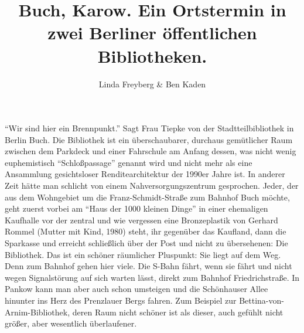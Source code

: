 \documentclass[a4paper,
fontsize=11pt,
oneside,
numbers=noperiodatend,
parskip=half-,
bibliography=totoc,
final
]{scrartcl}
\title{\LARGE{Buch, Karow. Ein Ortstermin in zwei Berliner öffentlichen Bibliotheken.}} %
\author{Linda Freyberg \& Ben Kaden} %
\date{}
\begin{document}
\maketitle
\thispagestyle{fancyplain} 


\enquote{Wir sind hier ein Brennpunkt.} Sagt Frau Tiepke von der
Stadtteilbibliothek in Berlin Buch. Die Bibliothek ist ein
überschaubarer, durchaus gemütlicher Raum zwischen dem Parkdeck und
einer Fahrschule am Anfang dessen, was nicht wenig euphemistisch
\enquote{Schloßpassage} genannt wird und nicht mehr als eine Ansammlung
gesichtsloser Renditearchitektur der 1990er Jahre ist. In anderer Zeit
hätte man schlicht von einem Nahversorgungszentrum gesprochen. Jeder,
der aus dem Wohngebiet um die Franz-Schmidt-Straße zum Bahnhof Buch
möchte, geht zuerst vorbei am \enquote{Haus der 1000 kleinen Dinge} in
einer ehemaligen Kaufhalle vor der zentral und wie vergessen eine
Bronzeplastik von Gerhard Rommel (Mutter mit Kind, 1980) steht, ihr
gegenüber das Kaufland, dann die Sparkasse und erreicht schließlich über
der Post und nicht zu übersehenen: Die Bibliothek. Das ist ein schöner
räumlicher Pluspunkt: Sie liegt auf dem Weg. Denn zum Bahnhof gehen hier
viele. Die S-Bahn fährt, wenn sie fährt und nicht wegen Signalstörung
auf sich warten lässt, direkt zum Bahnhof Friedrichstraße. In Pankow
kann man aber auch schon umsteigen und die Schönhauser Allee hinunter
ins Herz des Prenzlauer Bergs fahren. Zum Beispiel zur
Bettina-von-Arnim-Bibliothek, deren Raum nicht schöner ist als dieser,
auch gefühlt nicht größer, aber wesentlich überlaufener.
\end{document}
